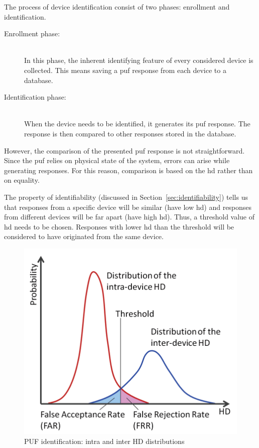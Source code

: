 The process of device identification consist of two phases: enrollment and identification\cite{Maes2012}.

\begin{description}
    \item[Enrollment phase:] \hfill \\ In this phase, the inherent identifying feature of every considered device is collected. This means saving a \gls{puf} response from each device to a database.
    \item[Identification phase:] \hfill \\ When the device needs to be identified, it generates its \gls{puf} response. The response is then compared to other responses stored in the database.
\end{description}

However, the comparison of the presented \gls{puf} response is not straightforward. Since the \gls{puf} relies on physical state of the system, errors can arise while generating responses. For this reason, comparison is based on the \gls{hd} rather than on equality.

The property of identifiability (discussed in Section~\ref{sec:identifiability}) tells us that responses from a specific device will be similar (have low \gls{hd}) and responses from different devices will be far apart (have high \gls{hd}). Thus, a threshold value of \gls{hd} needs to be chosen. Responses with lower \gls{hd} than the threshold will be considered to have originated from the same device.

\begin{figure}[ht!]
    \centering
    \captionsetup{justification=centering,margin=0.5cm}
    \includegraphics[scale=0.25]{images/identification_histogram.png}
    \caption[PUF identification: intra and inter HD distributions]{PUF identification: intra and inter HD distributions\cite{Hori2013}}
    \label{fig:puf_inter_intra_hd}
\end{figure}

